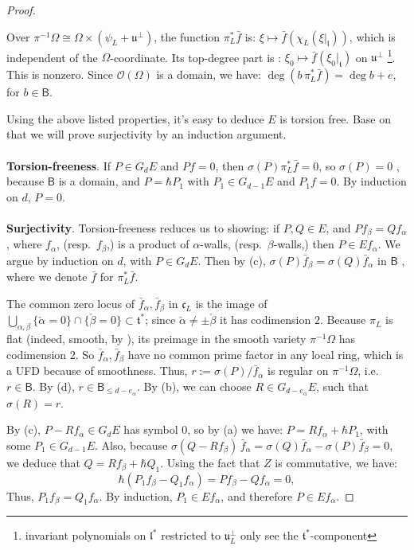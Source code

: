 \documentclass{article}
\theoremstyle{plain}
\theoremstyle{definition}
\theoremstyle{remark}
\numberwithin{equation}{section}
\begin{document}
\begin{proof}
\begin{enumerate}
Over $\pi^{-1}\Omega\cong \Omega\times(\psi_L+\mathfrak u^\perp)$, the function $\pi_L^*\bar f$ is: $\xi\mapsto\bar f(\chi_L(\xi|_{\mathfrak l}))$, which is 
independent of the $\Omega$-coordinate. Its top-degree part is : $\xi_0\mapsto\bar f(\xi_0|_{\mathfrak t})$ on $\mathfrak u^\perp$
\footnote{invariant polynomials on $\mathfrak l^*$ restricted to $\mathfrak u_L^\perp$ only see the $\mathfrak t^*$-component}.
This is nonzero. Since $\mathcal O(\Omega)$ is a domain, we have: $\deg(b\,\pi_L^*\bar f)=\deg b+e$, for $b\in \mathsf B$.
\end{enumerate}
Using the above listed properties, it's easy to deduce $E$ is torsion free. Base on that we will prove surjectivity by an induction argument.
\\ \hspace{\fill} \\
\textbf{Torsion-freeness}. If $P\in G_dE$ and $Pf=0$, then $\sigma(P)\pi_L^*\bar f=0$, so $\sigma(P)=0$ , because $\mathsf B$ is a
domain, and $P=\hbar P_1$ with $P_1\in G_{d-1}E$ and $P_1f=0$. By induction on $d$, $P=0$.
\\ \hspace{\fill} \\
\textbf{Surjectivity}. Torsion-freeness reduces us to showing: if $P,Q\in E$, and $Pf_\beta=Qf_\alpha$, where
$f_\alpha$, (resp.\ $f_\beta$,) is a product of $\alpha$-walls, (resp.\ $\beta$-walls,) then
$P\in Ef_\alpha$. We argue by induction on $d$, with $P\in G_dE$. Then
by (c), $\sigma(P)\bar f_\beta=\sigma(Q)\bar f_\alpha$ in $\mathsf B$ , where we denote $\bar f$ for $\pi_L^*\bar f$.

The common zero locus of $\bar f_\alpha,\bar f_\beta$ in $\mathfrak c_L$ is the image of
$\bigcup_{\alpha,\beta}\{\check\alpha=0\}\cap\{\check\beta=0\}\subset\mathfrak t^*$; since $\check\alpha\neq\pm\check\beta$
it has codimension $2$. Because $\pi_L$ is flat (indeed, smooth, by \cite[Lemma 3.2.4]{macerato2023leviequivariantrestrictionsphericalperverse}), its preimage in the smooth variety
$\pi^{-1}\Omega$ has codimension $2$. So $\bar f_\alpha,\bar f_\beta$ have no common prime factor in any local ring, which is a UFD because of smoothness. Thus, $r:=\sigma(P)/\bar f_\alpha$ is regular on $\pi^{-1}\Omega$, i.e.\ $r\in \mathsf B$. By (d), $r\in \mathsf B_{\le d-e_\alpha}$.
By (b), we can choose $R\in G_{d-e_\alpha}E$, such that $\sigma(R)=r$.

By (c), $P-Rf_\alpha\in G_dE$ has symbol $0$, so by (a) we have: $P=Rf_\alpha+\hbar P_1$,  with some $P_1\in G_{d-1}E$.
Also, because $\sigma(Q-Rf_\beta)\,\bar f_\alpha=\sigma(Q)\bar f_\alpha-\sigma(P)\bar f_\beta=0$, we deduce that $Q=Rf_\beta+\hbar Q_1$.
Using the fact that $Z$ is commutative, we have:
\[
\hbar(P_1f_\beta-Q_1f_\alpha)=Pf_\beta-Qf_\alpha=0,
\]
Thus, $P_1f_\beta=Q_1f_\alpha$. By induction, $P_1\in Ef_\alpha$, and therefore $P\in Ef_\alpha$.
\end{proof}
\end{document}
